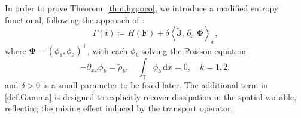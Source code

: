 \documentclass[reqno]{amsart}
\newcommand{\dx}{\,\partial_x\, }
\newcommand{\dd}{\,\mathrm{d}}
\newcommand{\T}{\mathbb{T}}
\newcommand{\rhot}{\widetilde{\rho}}
\newcommand{\Jt}{\widetilde{J}}
\newcommand{\Fbf}{\mathbf{F}}
\newcommand{\Phibf}{\boldsymbol{\Phi}}
\newcommand{\Jtbf}{\mathbf{\Jt}}
\newcommand{\lla}{\left\langle}
\newcommand{\rra}{\right\rangle}
\numberwithin{equation}{section}
\begin{document}
In order to prove Theorem~\ref{thm.hypoco}, we introduce a modified entropy functional, following the approach of \cite{FavrePirnerSchmeiser2023,DolbeaultMouhotSchmeiser2015}:
\begin{equation}\label{def.Gamma}
    \Gamma(t)\coloneq H(\Fbf)+\delta\lla \Jtbf,\dx\Phibf\rra_x,
\end{equation}
where $\Phibf=\left(\phi_1, \phi_2\right)^\top$, with each $\phi_k$ solving the Poisson equation
\begin{equation}\label{eq.Phi}
    -\partial_{xx}\phi_k=\rhot_k,\quad \int_\T \phi_k\dd x=0,\quad k=1,2,
\end{equation}
and $\delta>0$ is a small parameter to be fixed later. The additional term in \eqref{def.Gamma} is designed to explicitly recover dissipation in the spatial variable, reflecting the mixing effect induced by the transport operator.
\end{document}

